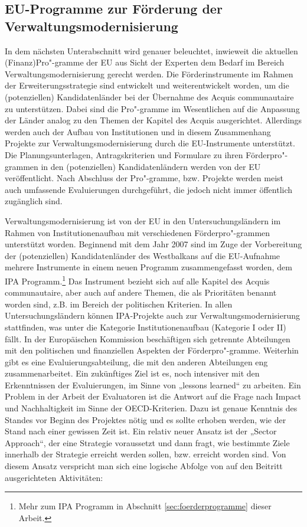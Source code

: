\subsection{EU-Programme zur Förderung der Verwaltungsmodernisierung }
In dem nächsten Unterabschnitt wird genauer beleuchtet, inwieweit die aktuellen (Finanz)Pro"-gramme der EU aus Sicht der Experten dem Bedarf im Bereich Verwaltungsmodernisierung gerecht werden. Die Förderinstrumente im Rahmen der Erweiterungsstrategie sind entwickelt und weiterentwickelt worden, um die (potenziellen) Kandidatenländer bei der Übernahme des Acquis communautaire zu unterstützen. Dabei sind die Pro"-gramme im Wesentlichen auf die Anpassung der Länder analog zu den Themen der Kapitel des Acquis ausgerichtet. Allerdings werden auch der Aufbau von Institutionen und in diesem Zusammenhang Projekte zur Verwaltungsmodernisierung durch die EU-Instrumente unterstützt. Die Planungsunterlagen, Antragskriterien und Formulare zu ihren Förderpro"-grammen in den (potenziellen) Kandidatenländern werden von der EU veröffentlicht. Nach Abschluss der Pro"-gramme, bzw. Projekte werden meist auch umfassende Evaluierungen durchgeführt, die jedoch nicht immer öffentlich zugänglich sind.\par
Verwaltungsmodernisierung ist von der EU in den Untersuchungsländern im Rahmen von Institutionenaufbau mit verschiedenen Förderpro"-grammen unterstützt worden. Beginnend mit dem Jahr 2007 sind im Zuge der Vorbereitung der (potenziellen) Kandidatenländer des Westbalkans auf die EU-Aufnahme mehrere Instrumente in einem neuen Programm zusammengefasst worden, dem IPA Programm.\footnote{Mehr zum IPA Programm in Abschnitt \ref{sec:foerderprogramme} dieser Arbeit.} Das Instrument bezieht sich auf alle Kapitel des Acquis communautaire, aber auch auf andere Themen, die als Prioritäten benannt worden sind, z.B. im Bereich der politischen Kriterien. In allen Untersuchungsländern können IPA-Projekte auch zur Verwaltungsmodernisierung stattfinden, was unter die Kategorie Institutionenaufbau (Kategorie I oder II) fällt. In der Europäischen Kommission beschäftigen sich getrennte Abteilungen mit den politischen und finanziellen Aspekten der Förderpro"-gramme. Weiterhin gibt es eine Evaluierungsabteilung, die mit den anderen Abteilungen eng zusammenarbeitet. Ein zukünftiges Ziel ist es, noch intensiver mit den Erkenntnissen der Evaluierungen, im Sinne von „lessons learned“ zu arbeiten. Ein Problem in der Arbeit der Evaluatoren ist die Antwort auf die Frage nach Impact und Nachhaltigkeit im Sinne der OECD-Kriterien. Dazu ist genaue Kenntnis des Standes vor Beginn des Projektes nötig und es sollte erhoben werden, wie der Stand nach einer gewissen Zeit ist. Ein relativ neuer Ansatz ist der „Sector Approach“, der eine Strategie voraussetzt und dann fragt, wie bestimmte Ziele innerhalb der Strategie erreicht werden sollen, bzw. erreicht worden sind. Von diesem Ansatz verspricht man sich eine logische Abfolge von auf den Beitritt ausgerichteten Aktivitäten:
